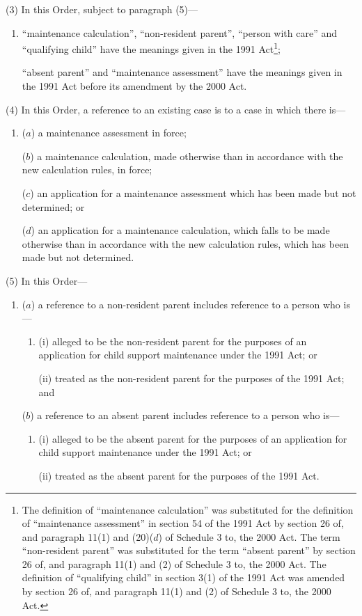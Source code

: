 \documentclass[12pt,a4paper]{article}
\begin{document}
(3) In this Order, subject to paragraph (5)—
\begin{enumerate}\item[]
“maintenance calculation”, “non-resident parent”, “person with care” and “qualifying child” have the meanings given in the 1991 Act\footnote{The definition of “maintenance calculation” was substituted for the definition of “maintenance assessment” in section 54 of the 1991 Act by section 26 of, and paragraph 11(1) and (20)($d$)  of Schedule 3 to, the 2000 Act. The term “non-resident parent” was substituted for the term “absent parent” by section 26 of, and paragraph 11(1) and (2) of Schedule 3 to, the 2000 Act. The definition of “qualifying child” in section 3(1) of the 1991 Act was amended by section 26 of, and paragraph 11(1) and (2) of Schedule 3 to, the 2000 Act.};

“absent parent” and “maintenance assessment” have the meanings given in the 1991 Act before its amendment by the 2000 Act.
\end{enumerate}

(4) In this Order, a reference to an existing case is to a case in which there is—
\begin{enumerate}\item[]
($a$) a maintenance assessment in force;

($b$) a maintenance calculation, made otherwise than in accordance with the new calculation rules, in force;

($c$) an application for a maintenance assessment which has been made but not determined; or

($d$) an application for a maintenance calculation, which falls to be made otherwise than in accordance with the new calculation rules, which has been made but not determined.
\end{enumerate}

(5) In this Order—
\begin{enumerate}\item[]
($a$) a reference to a non-resident parent includes reference to a person who is—
\begin{enumerate}\item[]
(i) alleged to be the non-resident parent for the purposes of an application for child support maintenance under the 1991 Act; or

(ii) treated as the non-resident parent for the purposes of the 1991 Act; and
\end{enumerate}

($b$) a reference to an absent parent includes reference to a person who is—
\begin{enumerate}\item[]
(i) alleged to be the absent parent for the purposes of an application for child support maintenance under the 1991 Act; or

(ii) treated as the absent parent for the purposes of the 1991 Act.
\end{enumerate}
\end{enumerate}
\end{document}
